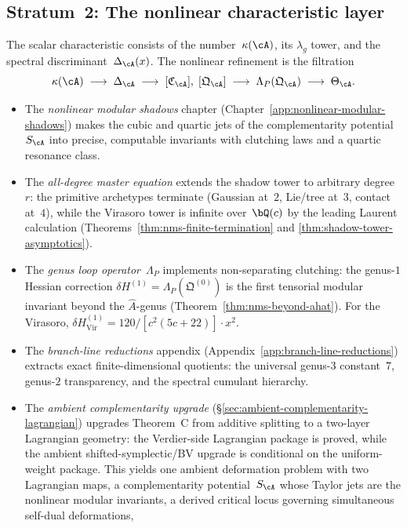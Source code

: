 \subsection*{Stratum~2: The nonlinear characteristic layer}
The scalar characteristic consists of the number~$\kappa(\cA)$,
its $\lambda_g$ tower, and the spectral discriminant~$\Delta_\cA(x)$.
The nonlinear refinement is the filtration
\[
\kappa(\cA)
\;\longrightarrow\;
\Delta_\cA
\;\longrightarrow\;
[\mathfrak{C}_\cA],\;
[\mathfrak{Q}_\cA]
\;\longrightarrow\;
\Lambda_P(\mathfrak{Q}_\cA)
\;\longrightarrow\;
\Theta_\cA.
\]
\begin{itemize}
\item The \emph{nonlinear modular shadows} chapter
 (Chapter~\ref{app:nonlinear-modular-shadows}) makes the
 cubic and quartic jets of the complementarity
 potential~$S_\cA$ into precise, computable invariants with
 clutching laws and a quartic resonance class.
\item The \emph{all-degree master equation} extends the shadow
tower to arbitrary degree~$r$: the primitive archetypes terminate
(Gaussian at~$2$, Lie/tree at~$3$, contact at~$4$), while
 the Virasoro tower is infinite over~$\bQ(c)$ by the leading Laurent
 calculation
 (Theorems~\ref{thm:nms-finite-termination} and
 \ref{thm:shadow-tower-asymptotics}).
\item The \emph{genus loop operator}~$\Lambda_P$ implements
 non-separating clutching: the genus-$1$ Hessian correction
 $\delta H^{(1)}=\Lambda_P(\mathfrak Q^{(0)})$ is the first
 tensorial modular invariant beyond the $\hat{A}$-genus
 (Theorem~\ref{thm:nms-beyond-ahat}). For the Virasoro,
 $\delta H^{(1)}_{\mathrm{Vir}}
 =120/[c^2(5c+22)]\cdot x^2$.
\item The \emph{branch-line reductions} appendix
 (Appendix~\ref{app:branch-line-reductions}) extracts exact
 finite-dimensional quotients: the universal genus-$3$
 constant~$7$, genus-$2$ transparency, and the spectral
 cumulant hierarchy.
\item The \emph{ambient complementarity upgrade}
 (\S\ref{sec:ambient-complementarity-lagrangian}) upgrades
 Theorem~C from additive splitting to a two-layer Lagrangian
 geometry: the Verdier-side Lagrangian package is proved, while the
 ambient shifted-symplectic/BV upgrade is conditional on the
 uniform-weight package. This yields one ambient deformation problem
 with two Lagrangian maps, a complementarity potential~$S_\cA$
 whose Taylor jets are the nonlinear modular invariants, a derived
 critical locus governing simultaneous self-dual deformations,

\end{itemize}
